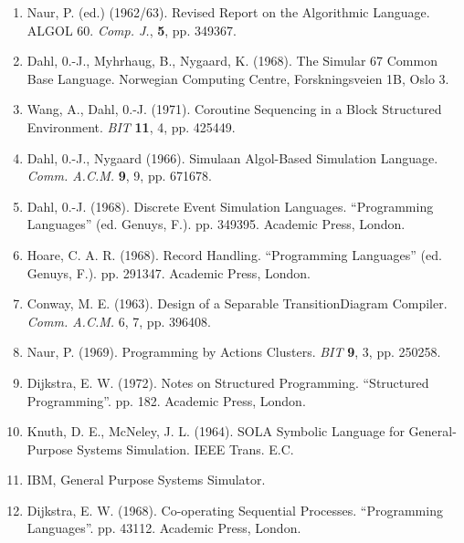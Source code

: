 \begin{enumerate}[leftmargin=*, itemsep=.1em, wide=0pt, align=left, label=(\arabic*)]
	\item \label{ref:1}
	Naur, P. (ed.) (1962/63). Revised Report on the Algorithmic Language. ALGOL 60. \textit{Comp. J.}, \textbf{5}, pp. 349\textendash{}367.
	
	\item \label{ref:2}
	Dahl, 0.-J., Myhrhaug, B., Nygaard, K. (1968). The Simular 67 Common Base Language. Norwegian Computing Centre, Forskningsveien 1B, Oslo 3.
	
	\item \label{ref:3}
	Wang, A., Dahl, 0.-J. (1971). Coroutine Sequencing in a Block Structured Environment. \textit{BIT} \textbf{11}, 4, pp. 425\textendash{}449.
	
	\item \label{ref:4}
	Dahl, 0.-J., Nygaard (1966). Simula\textemdash{}an Algol-Based Simulation Language. \textit{Comm. A.C.M.} \textbf{9}, 9, pp. 671\textendash{}678. 
	
	\item \label{ref:5}
	Dahl, 0.-J. (1968). Discrete Event Simulation Languages. ``Programming Languages'' (ed. Genuys, F.). pp. 349\textendash{}395. Academic Press, London.
	
	\item \label{ref:6}
	Hoare, C. A. R. (1968). Record Handling. ``Programming Languages'' (ed. Genuys, F.). pp. 291\textendash{}347. Academic Press, London.
	
	\item \label{ref:7}
	Conway, M. E. (1963). Design of a Separable Transition\textemdash{}Diagram Compiler. \textit{Comm. A.C.M.} 6, 7, pp. 396\textendash{}408.
	
	\item \label{ref:8}
	Naur, P. (1969). Programming by Actions Clusters. \textit{BIT} \textbf{9}, 3, pp. 250\textendash{}258.
	
	\item \label{ref:9}
	Dijkstra, E. W. (1972). Notes on Structured Programming. ``Structured Programming''. pp. 1\textendash{}82. Academic Press, London.
	
	\item \label{ref:10}
	Knuth, D. E., McNeley, J. L. (1964). SOL\textemdash{}A Symbolic Language for General-Purpose Systems Simulation. IEEE Trans. E.C.
	
	\item \label{ref:11}
	IBM, General Purpose Systems Simulator.
	
	\item \label{ref:12}
	Dijkstra, E. W. (1968). Co-operating Sequential Processes. ``Programming Languages''. pp. 43\textendash{}112. Academic Press, London.
\end{enumerate}
